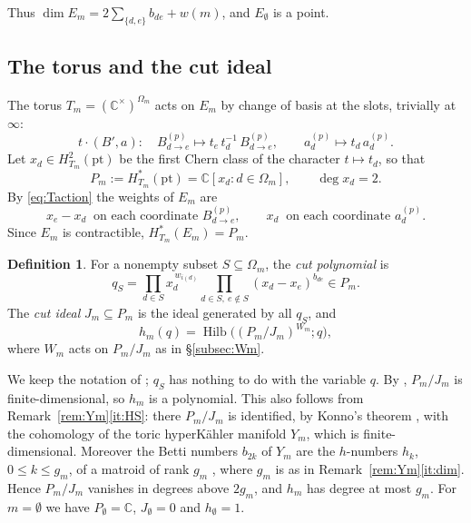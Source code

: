 \documentclass[11pt]{amsart}
\theoremstyle{definition}
\newtheorem{definition}[theorem]{Definition}
\theoremstyle{remark}
\numberwithin{equation}{section}
\newcommand{\C}{\mathbb{C}}
\newcommand{\Om}{\Omega_m}
\DeclareMathOperator{\Hilb}{Hilb}
\begin{document}
Thus $\dim E_m=2\sum_{\{d,e\}}b_{de}+w(m)$, and $E_\emptyset$ is a point.

\subsection{The torus and the cut ideal}\label{subsec:torus}
The torus $T_m=(\C^\times)^{\Om}$ acts on $E_m$ by change of basis at the slots, trivially at $\infty$:
\begin{equation}\label{eq:Taction}
  t\cdot(B',a):\quad B^{(p)}_{d\to e}\mapsto t_e\,t_d^{-1}\,B^{(p)}_{d\to e},\qquad
  a^{(p)}_d\mapsto t_d\,a^{(p)}_d .
\end{equation}
Let $x_d\in H^2_{T_m}(\mathrm{pt})$ be the first Chern class of the character $t\mapsto t_d$, so that
\[
  P_m:=H^*_{T_m}(\mathrm{pt})=\C[x_d:d\in\Om],\qquad \deg x_d=2 .
\]
By \eqref{eq:Taction} the weights of $E_m$ are
\begin{equation}\label{eq:weights}
  x_e-x_d\ \text{ on each coordinate } B^{(p)}_{d\to e},\qquad x_d\ \text{ on each coordinate } a^{(p)}_d .
\end{equation}
Since $E_m$ is contractible, $H^*_{T_m}(E_m)=P_m$.

\begin{definition}\label{def:cut}
For a nonempty subset $S\subseteq\Om$, the \emph{cut polynomial} \cite[(5.3)]{Hik} is
\[
  q_S=\prod_{d\in S}x_d^{\,w_{i(d)}}\prod_{d\in S,\ e\notin S}(x_d-x_e)^{b_{de}}\in P_m .
\]
The \emph{cut ideal} $J_m\subseteq P_m$ is the ideal generated by all $q_S$, and
\[
  h_m(q)=\Hilb\big((P_m/J_m)^{W_m};q\big),
\]
where $W_m$ acts on $P_m/J_m$ as in \S\ref{subsec:Wm}.
\end{definition}

We keep the notation of \cite{Hik}; $q_S$ has nothing to do with the variable $q$. By
\cite[Lemma~6.1]{Hik}, $P_m/J_m$ is finite-dimensional, so $h_m$ is a polynomial. This also follows from
Remark~\ref{rem:Ym}\ref{it:HS}: there $P_m/J_m$ is identified, by Konno's theorem
\cite[Theorem~3.1]{Kon00}, with the cohomology of the toric hyperK\"ahler manifold $Y_m$, which is
finite-dimensional. Moreover the Betti numbers $b_{2k}$ of $Y_m$ are the $h$-numbers $h_k$,
$0\le k\le g_m$, of a matroid of rank $g_m$ \cite[Corollaries~4.6 and~6.6]{HS}, where $g_m$ is as in
Remark~\ref{rem:Ym}\ref{it:dim}. Hence $P_m/J_m$ vanishes in degrees above $2g_m$, and $h_m$ has degree at
most $g_m$. For $m=\emptyset$ we have $P_\emptyset=\C$, $J_\emptyset=0$ and $h_\emptyset=1$.
\end{document}
